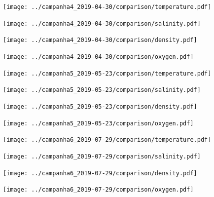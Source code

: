 \documentclass{article}
\begin{document}
\begin{figure}
	\texttt{[image: ../campanha4\_2019-04-30/comparison/temperature.pdf]}
\end{figure}

\begin{figure}
	\texttt{[image: ../campanha4\_2019-04-30/comparison/salinity.pdf]}
\end{figure}

\begin{figure}
	\texttt{[image: ../campanha4\_2019-04-30/comparison/density.pdf]}
\end{figure}

\begin{figure}
	\texttt{[image: ../campanha4\_2019-04-30/comparison/oxygen.pdf]}
\end{figure}

\begin{figure}
	\texttt{[image: ../campanha5\_2019-05-23/comparison/temperature.pdf]}
\end{figure}

\begin{figure}
	\texttt{[image: ../campanha5\_2019-05-23/comparison/salinity.pdf]}
\end{figure}

\begin{figure}
	\texttt{[image: ../campanha5\_2019-05-23/comparison/density.pdf]}
\end{figure}

\begin{figure}
	\texttt{[image: ../campanha5\_2019-05-23/comparison/oxygen.pdf]}
\end{figure}

\begin{figure}
	\texttt{[image: ../campanha6\_2019-07-29/comparison/temperature.pdf]}
\end{figure}

\begin{figure}
	\texttt{[image: ../campanha6\_2019-07-29/comparison/salinity.pdf]}
\end{figure}

\begin{figure}
	\texttt{[image: ../campanha6\_2019-07-29/comparison/density.pdf]}
\end{figure}

\begin{figure}
	\texttt{[image: ../campanha6\_2019-07-29/comparison/oxygen.pdf]}
\end{figure}
\end{document}
